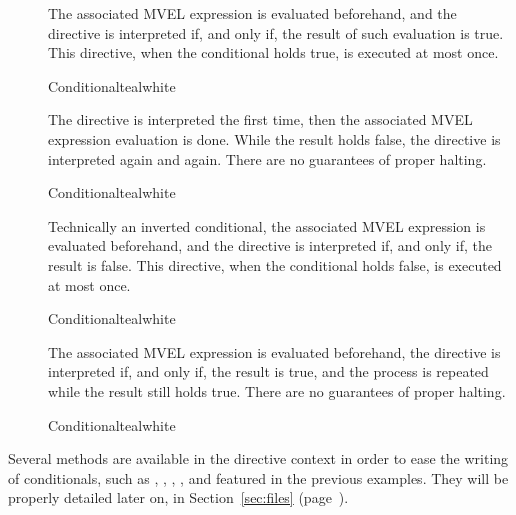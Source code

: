 \begin{description}
\item[] The associated MVEL expression is evaluated beforehand, and the directive is interpreted if, and only if, the result of such evaluation is true. This directive, when the conditional holds true, is executed at most once.

\begin{codebox}{Conditional}{teal}{\icnote}{white}
\end{codebox}

\item[] The directive is interpreted the first time, then the associated MVEL expression evaluation is done. While the result holds false, the directive is interpreted again and again. There are no guarantees of proper halting.

\begin{codebox}{Conditional}{teal}{\icnote}{white}
\end{codebox}

\item[] Technically an inverted  conditional, the associated MVEL expression is evaluated beforehand, and the directive is interpreted if, and only if, the result is false. This directive, when the conditional holds false, is executed at most once.

\begin{codebox}{Conditional}{teal}{\icnote}{white}
\end{codebox}

\item[] The associated MVEL expression is evaluated beforehand, the directive is interpreted if, and only if, the result is true, and the process is repeated while the result still holds true. There are no guarantees of proper halting.

\begin{codebox}{Conditional}{teal}{\icnote}{white}
\end{codebox}
\end{description}

Several methods are available in the directive context in order to ease the writing of conditionals, such as , , , , and  featured in the previous examples. They will be properly detailed later on, in Section~\ref{sec:files} (page~\pageref{sec:files}).

